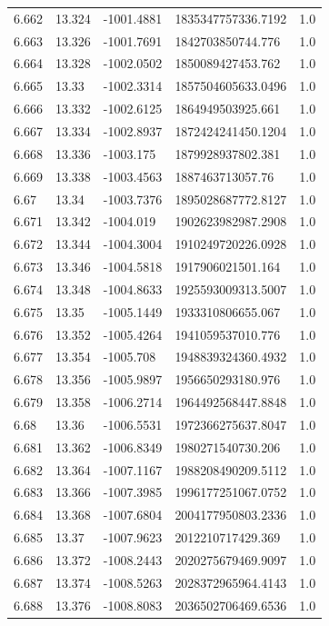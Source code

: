 \begin{tabular}{lllll}
6.662 & 13.324 & -1001.4881 & 1835347757336.7192 & 1.0 \\
6.663 & 13.326 & -1001.7691 & 1842703850744.776 & 1.0 \\
6.664 & 13.328 & -1002.0502 & 1850089427453.762 & 1.0 \\
6.665 & 13.33 & -1002.3314 & 1857504605633.0496 & 1.0 \\
6.666 & 13.332 & -1002.6125 & 1864949503925.661 & 1.0 \\
6.667 & 13.334 & -1002.8937 & 1872424241450.1204 & 1.0 \\
6.668 & 13.336 & -1003.175 & 1879928937802.381 & 1.0 \\
6.669 & 13.338 & -1003.4563 & 1887463713057.76 & 1.0 \\
6.67 & 13.34 & -1003.7376 & 1895028687772.8127 & 1.0 \\
6.671 & 13.342 & -1004.019 & 1902623982987.2908 & 1.0 \\
6.672 & 13.344 & -1004.3004 & 1910249720226.0928 & 1.0 \\
6.673 & 13.346 & -1004.5818 & 1917906021501.164 & 1.0 \\
6.674 & 13.348 & -1004.8633 & 1925593009313.5007 & 1.0 \\
6.675 & 13.35 & -1005.1449 & 1933310806655.067 & 1.0 \\
6.676 & 13.352 & -1005.4264 & 1941059537010.776 & 1.0 \\
6.677 & 13.354 & -1005.708 & 1948839324360.4932 & 1.0 \\
6.678 & 13.356 & -1005.9897 & 1956650293180.976 & 1.0 \\
6.679 & 13.358 & -1006.2714 & 1964492568447.8848 & 1.0 \\
6.68 & 13.36 & -1006.5531 & 1972366275637.8047 & 1.0 \\
6.681 & 13.362 & -1006.8349 & 1980271540730.206 & 1.0 \\
6.682 & 13.364 & -1007.1167 & 1988208490209.5112 & 1.0 \\
6.683 & 13.366 & -1007.3985 & 1996177251067.0752 & 1.0 \\
6.684 & 13.368 & -1007.6804 & 2004177950803.2336 & 1.0 \\
6.685 & 13.37 & -1007.9623 & 2012210717429.369 & 1.0 \\
6.686 & 13.372 & -1008.2443 & 2020275679469.9097 & 1.0 \\
6.687 & 13.374 & -1008.5263 & 2028372965964.4143 & 1.0 \\
6.688 & 13.376 & -1008.8083 & 2036502706469.6536 & 1.0 \\

\end{tabular}
